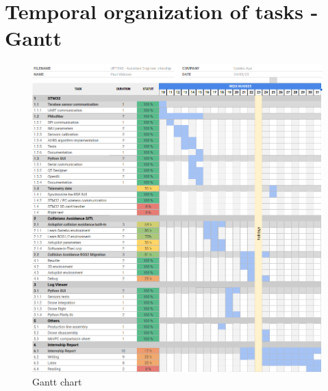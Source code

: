 \chapter{Temporal organization of tasks - Gantt}
\begin{figure}[H]
    \centering
    \includegraphics[width=0.9\linewidth]{./gantt/gantt.png}
    \caption{Gantt chart}
\end{figure}